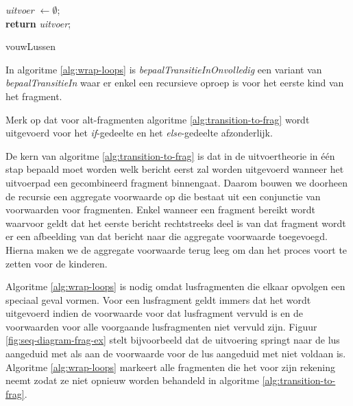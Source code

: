 \begin{algorithm}
	\textit{uitvoer $\leftarrow \emptyset$}; \\
	\textbf{return} \textit{uitvoer};
	\caption{vouwLussen}
	\label{alg:wrap-loops}
\end{algorithm}

In algoritme \ref{alg:wrap-loops} is \textit{bepaalTransitieInOnvolledig} een variant van \textit{bepaalTransitieIn} waar er enkel een recursieve oproep is voor het eerste kind van het fragment.

Merk op dat voor alt-fragmenten algoritme \ref{alg:transition-to-frag} wordt uitgevoerd voor het \textit{if}-gedeelte en het \textit{else}-gedeelte afzonderlijk.

De kern van algoritme \ref{alg:transition-to-frag} is dat in de uitvoertheorie in \'e\'en stap bepaald moet worden welk bericht eerst zal worden uitgevoerd wanneer het uitvoerpad een gecombineerd fragment binnengaat. Daarom bouwen we doorheen de recursie een aggregate voorwaarde op die bestaat uit een conjunctie van voorwaarden voor fragmenten. Enkel wanneer een fragment bereikt wordt waarvoor geldt dat het eerste bericht rechtstreeks deel is van dat fragment wordt er een afbeelding van dat bericht naar die aggregate voorwaarde toegevoegd. Hierna maken we de aggregate voorwaarde terug leeg om dan het proces voort te zetten voor de kinderen.

Algoritme \ref{alg:wrap-loops} is nodig omdat lusfragmenten die elkaar opvolgen een speciaal geval vormen. Voor een lusfragment geldt immers dat het wordt uitgevoerd indien de voorwaarde voor dat lusfragment vervuld is en de voorwaarden voor alle voorgaande lusfragmenten niet vervuld zijn. Figuur \ref{fig:seq-diagram-frag-ex} stelt bijvoorbeeld dat de uitvoering springt naar de lus aangeduid met  als aan de voorwaarde voor de lus aangeduid met  niet voldaan is. Algoritme \ref{alg:wrap-loops} markeert alle fragmenten die het voor zijn rekening neemt zodat ze niet opnieuw worden behandeld in algoritme \ref{alg:transition-to-frag}.

